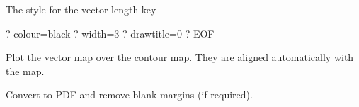 The style for the vector length key

\begin{terminalv}
?   colour=black
?   width=3
?   drawtitle=0
? EOF
\end{terminalv}


Plot the vector map over the contour map. They are aligned automatically with the map.

\begin{terminalv}
\end{terminalv}


Convert to PDF and remove blank margins (if required).

\begin{terminalv}
\end{terminalv}
